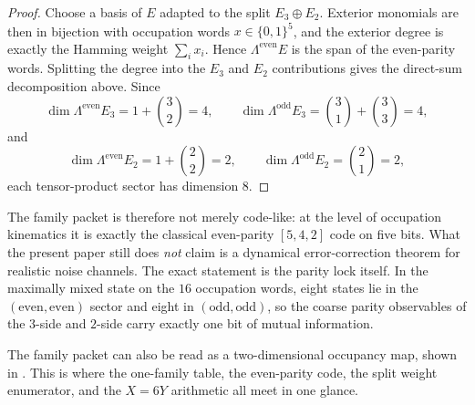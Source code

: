 \begin{proof}
Choose a basis of $E$ adapted to the split $E_3\oplus E_2$. Exterior monomials are then in bijection with occupation words $x\in\{0,1\}^5$, and the exterior degree is exactly the Hamming weight $\sum_i x_i$. Hence $\Lambda^{\mathrm{even}}E$ is the span of the even-parity words. Splitting the degree into the $E_3$ and $E_2$ contributions gives the direct-sum decomposition above. Since
\[
\dim \Lambda^{\mathrm{even}}E_3=1+\binom32=4,
\qquad
\dim \Lambda^{\mathrm{odd}}E_3=\binom31+\binom33=4,
\]
and
\[
\dim \Lambda^{\mathrm{even}}E_2=1+\binom22=2,
\qquad
\dim \Lambda^{\mathrm{odd}}E_2=\binom21=2,
\]
each tensor-product sector has dimension $8$.
\end{proof}

\begin{remark}
The family packet is therefore not merely code-like: at the level of occupation kinematics it is exactly the classical even-parity $[5,4,2]$ code on five bits. What the present paper still does \emph{not} claim is a dynamical error-correction theorem for realistic noise channels. The exact statement is the parity lock itself. In the maximally mixed state on the $16$ occupation words, eight states lie in the $(\mathrm{even},\mathrm{even})$ sector and eight in $(\mathrm{odd},\mathrm{odd})$, so the coarse parity observables of the $3$-side and $2$-side carry exactly one bit of mutual information.
\end{remark}

The family packet can also be read as a two-dimensional occupancy map, shown in . This is where the one-family table, the even-parity code, the split weight enumerator, and the $X=6Y$ arithmetic all meet in one glance.

